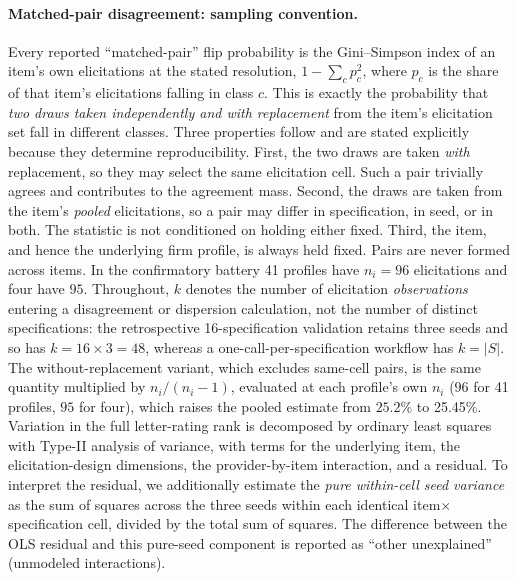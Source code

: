 \documentclass[a4paper,fleqn]{cas-sc}
\begin{document}
\paragraph{Matched-pair disagreement: sampling convention.} Every reported ``matched-pair'' flip
probability is the Gini--Simpson index of an item's own elicitations at the stated resolution,
$1-\sum_c p_c^2$, where $p_c$ is the share of that item's elicitations falling in class $c$. This is
exactly the probability that \emph{two draws taken independently and with replacement} from the
item's elicitation set fall in different classes. Three properties follow and are stated explicitly
because they determine reproducibility. First, the two draws are taken \emph{with} replacement, so
they may select the same elicitation cell. Such a pair trivially agrees and contributes to the
agreement mass. Second, the draws are taken from the item's \emph{pooled} elicitations, so a pair
may differ in specification, in seed, or in both. The statistic is not conditioned on holding either
fixed. Third, the item, and hence the underlying firm profile, is always held fixed. Pairs are never
formed across items. In the confirmatory battery 41 profiles have $n_i=96$ elicitations and four have $95$. Throughout, $k$ denotes the number of elicitation \emph{observations} entering a disagreement or dispersion calculation, not the number of distinct specifications: the retrospective 16-specification validation retains three seeds and so has $k=16\times3=48$, whereas a one-call-per-specification workflow has $k=|S|$. The
without-replacement variant, which excludes same-cell pairs, is the same quantity multiplied by
$n_i/(n_i-1)$, evaluated at each profile's own $n_i$ ($96$ for 41 profiles, $95$ for four), which raises the pooled estimate from $25.2\%$ to 25.45\%. Variation in the full letter-rating rank is decomposed by
ordinary least squares with Type-II analysis of variance, with terms for the underlying item, the
elicitation-design dimensions, the provider-by-item interaction, and a residual. To interpret the
residual, we additionally estimate the \emph{pure within-cell seed variance} as the sum of squares across
the three seeds within each identical item$\times$specification cell, divided by the total sum of squares.
The difference between the OLS residual and this pure-seed component is reported as ``other unexplained''
(unmodeled interactions).
\end{document}
